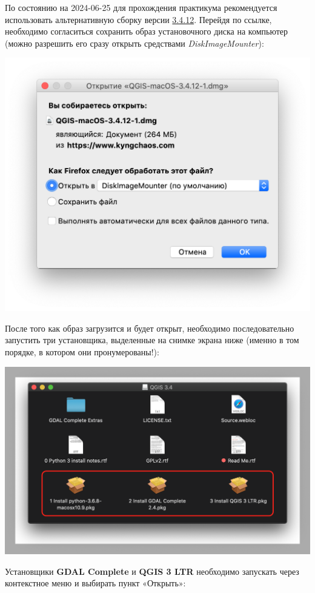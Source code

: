 \documentclass[
  12pt,
]{book}
\begin{document}
По состоянию на 2024-06-25 для прохождения практикума рекомендуется использовать альтернативную сборку версии \href{https://www.kyngchaos.com/files/software/qgis/QGIS-macOS-3.4.12-1.dmg}{3.4.12}. Перейдя по ссылке, необходимо согласиться сохранить образ установочного диска на компьютер (можно разрешить его сразу открыть средствами \emph{DiskImageMounter}):

\includegraphics{images/Index0/mac01.png}

После того как образ загрузится и будет открыт, необходимо последовательно запустить три установщика, выделенные на снимке экрана ниже (именно в том порядке, в котором они пронумерованы!):

\includegraphics{images/Index0/mac02.png}

Установщики \textbf{GDAL Complete} и \textbf{QGIS 3 LTR} необходимо запускать через контекстное меню и выбирать пункт «Открыть»:
\end{document}
